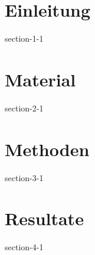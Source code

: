 \chapter{Einleitung}
{section-1-1}

\chapter{Material}
{section-2-1}

\chapter{Methoden}
{section-3-1}

\chapter{Resultate}
{section-4-1}




